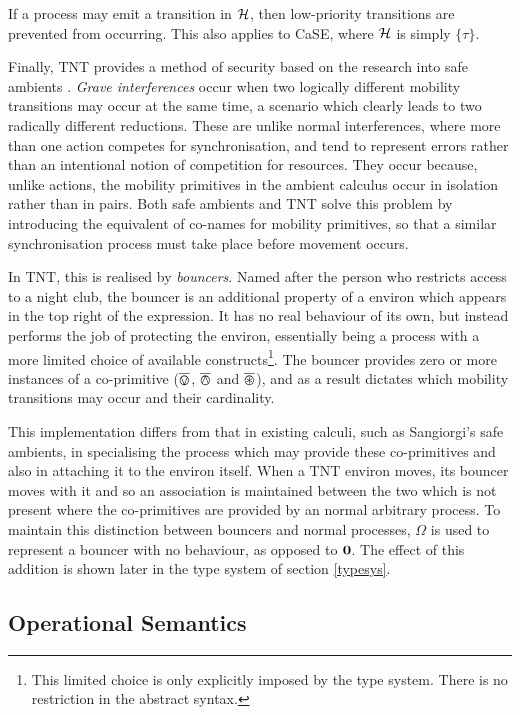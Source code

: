 \documentclass[orivec,envcountsame]{llncs}
\begin{document}
If a process may emit a transition in $\text{$\mathcal{H}$}$, then low-priority
transitions are prevented from occurring.  This also applies to CaSE,
where $\text{$\mathcal{H}$}$ is simply $\{ \tau \}$.

Finally, TNT provides a method of security based on the research into
safe ambients \cite{sangiorgi:mobsafeambients}.  \emph{Grave
interferences} occur when two logically different mobility transitions may
occur at the same time, a scenario which clearly leads to two radically
different reductions.  These are unlike normal interferences, where more
than one action competes for synchronisation, and tend to represent
errors rather than an intentional notion of competition for resources.
They occur because, unlike actions, the mobility primitives in the
ambient calculus occur in isolation rather than in pairs.  Both safe
ambients and TNT solve this problem by introducing the equivalent of
co-names for mobility primitives, so that a similar synchronisation
process must take place before movement occurs.

In TNT, this is realised by \emph{bouncers}.  Named after the person who
restricts access to a night club, the bouncer is an additional property
of a environ which appears in the top right of the expression.  It has
no real behaviour of its own, but instead performs the job of protecting
the environ, essentially being a process with a more limited choice of
available constructs\footnote{This limited choice is only explicitly
imposed by the type system.  There is no restriction in the abstract
syntax.}.  The bouncer provides zero or more instances of a co-primitive
($\overline{\varovee}$, $\overline{\varowedge}$ and $\overline{\varoast}$), and as a result dictates which mobility
transitions may occur and their cardinality.

This implementation differs from that in existing calculi, such as
Sangiorgi's safe ambients, in specialising the process which may provide
these co-primitives and also in attaching it to the environ itself.
When a TNT environ moves, its bouncer moves with it and so an
association is maintained between the two which is not present where the
co-primitives are provided by an normal arbitrary process.  To maintain
this distinction between bouncers and normal processes, $\Omega$ is used
to represent a bouncer with no behaviour, as opposed to $\textbf{0}$.  The
effect of this addition is shown later in the type system of section
\ref{typesys}.

\subsection{Operational Semantics}
\end{document}
